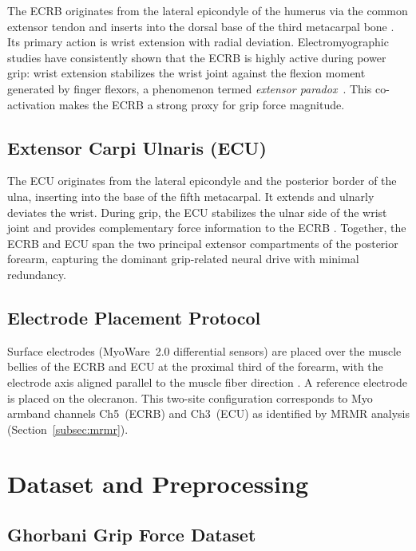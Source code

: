 \documentclass[journal]{IEEEtran}
\begin{document}
The ECRB originates from the lateral epicondyle of the humerus via the
common extensor tendon and inserts into the dorsal base of the third
metacarpal bone \cite{basmajian1985muscles}.  Its primary action is
wrist extension with radial deviation.  Electromyographic studies have
consistently shown that the ECRB is highly active during power grip:
wrist extension stabilizes the wrist joint against the flexion moment
generated by finger flexors, a phenomenon termed \emph{extensor
paradox}~\cite{criswell2011cram}.  This co-activation makes the ECRB
a strong proxy for grip force magnitude.

\subsection{Extensor Carpi Ulnaris (ECU)}

The ECU originates from the lateral epicondyle and the posterior border
of the ulna, inserting into the base of the fifth metacarpal.  It
extends and ulnarly deviates the wrist.  During grip, the ECU
stabilizes the ulnar side of the wrist joint and provides complementary
force information to the ECRB \cite{basmajian1985muscles}.  Together,
the ECRB and ECU span the two principal extensor compartments of the
posterior forearm, capturing the dominant grip-related neural drive
with minimal redundancy.

\subsection{Electrode Placement Protocol}

Surface electrodes (MyoWare~2.0 differential sensors) are placed over
the muscle bellies of the ECRB and ECU at the proximal third of the
forearm, with the electrode axis aligned parallel to the muscle fiber
direction \cite{deluca1997use,criswell2011cram}.  A reference electrode
is placed on the olecranon.  This two-site configuration corresponds
to Myo armband channels Ch5~(ECRB) and Ch3~(ECU) as identified by
MRMR analysis (Section~\ref{subsec:mrmr}).

\section{Dataset and Preprocessing}
\label{sec:dataset}

\subsection{Ghorbani Grip Force Dataset}
\end{document}
